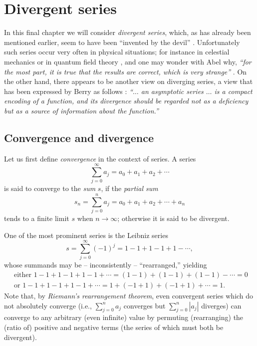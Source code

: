 \chapter{Divergent series}
\label{2011-m-ch-ds}
In this final chapter we will consider {\em divergent series}, which,
as has already been mentioned earlier,
seem to have been ``invented by the devil'' \cite{Hardy:1949}.
Unfortunately such series occur
very often in physical situations;
for instance in celestial mechanics or in quantum field theory
\cite{Boyd99thedevil,PhysRev.85.631,PhysRevD.57.1144,PhysRevD.62.076001},
and one may wonder with Abel why, {\em ``for the most part,
it is true that the results are correct, which is very strange''  }
\cite{rousseau-2004}.
On the other hand,
there appears to be another view on diverging series,
a view that has been expressed by Berry as follows
\cite{berry-92}:
{\em ``$\ldots$ an asymptotic series $\ldots$ is a compact encoding of a function,
and its divergence should be regarded not as a deficiency but as a source of information about the function.''
}

\section{Convergence and divergence}
Let us first define {\em convergence} in the context of series.
A series
\begin{equation}
\sum_{j=0}^\infty a_j =a_0+a_1+a_2+\cdots
\end{equation}
is said to converge to the {\em sum}
$s$, if the {\em partial sum}
\begin{equation}
s_n=  \sum_{j=0}^n a_j =a_0+a_1+a_2+\cdots + a_n
\end{equation}
tends to a finite limit $s$ when $n\rightarrow \infty$;
otherwise it is said to be divergent.

One of the most prominent series is the
Leibniz series~\cite{leibnitz-1860,moore-1938,Hardy:1949,everest-2003}
\begin{equation}
s = \sum_{j=0}^\infty (-1)^j=1-1+1-1+1-\cdots ,
\label{2009-fiftyfifty-1s}
\end{equation}
whose summands may be -- inconsistently
-- ``rearranged,''
yielding
\begin{equation*}
\begin{split}
\textrm{ either }
1-1+1-1+1-1+\cdots = (1-1)+(1-1)+(1-1)-\cdots =0\\
\textrm{ or }
1-1+1-1+1-1+\cdots = 1+(-1+1)+ (-1+1) +\cdots =1.
\end{split}
\end{equation*}
Note that, by {\em Riemann's rearrangement theorem},
even convergent series  which do not absolutely converge
(i.e., $\sum_{j=0}^n a_j$ converges but $\sum_{j=0}^n \left| a_j \right|$ diverges)
can converge to any arbitrary (even infinite) value
by permuting (rearranging) the (ratio of) positive and negative terms
(the series of which must both be divergent).


